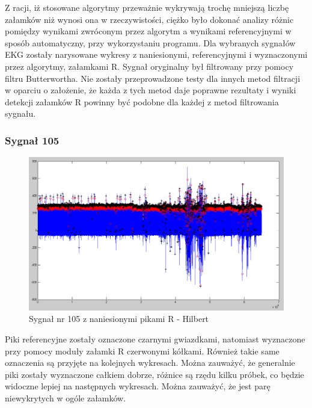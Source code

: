 Z racji, iż stosowane algorytmy przeważnie wykrywają trochę mniejszą liczbę załamków niż wynosi ona w rzeczywistości, ciężko było dokonać analizy różnic pomiędzy wynikami zwróconym przez algorytm a wynikami referencyjnymi w sposób automatyczny, przy wykorzystaniu programu. Dla wybranych sygnałów EKG zostały narysowane wykresy z naniesionymi, referencyjnymi i wyznaczonymi przez algorytmy, załamkami R. Sygnał oryginalny był filtrowany przy pomocy filtru Butterwortha. Nie zostały przeprowadzone testy dla innych metod filtracji w oparciu o założenie, że każda z tych metod daje poprawne rezultaty i wyniki detekcji załamków R powinny być podobne dla każdej z metod filtrowania sygnału.
\subsubsection{Sygnał 105}
\begin{figure}[H]
\centering
\includegraphics[scale=0.4]{R_PEAKS/img/105_hilbert_calosc}
\caption{Sygnał nr 105 z naniesionymi pikami R - Hilbert}
\label{fig:105HC}
\end{figure}
Piki referencyjne zostały oznaczone czarnymi gwiazdkami, natomiast wyznaczone przy pomocy moduły załamki R czerwonymi kółkami. Również takie same oznaczenia są przyjęte na kolejnych wykresach. Można zauważyć, że generalnie piki zostały wyznaczone całkiem dobrze, różnice są rzędu kilku próbek, co będzie widoczne lepiej na następnych wykresach. Można zauważyć, że jest parę niewykrytych w ogóle załamków.

